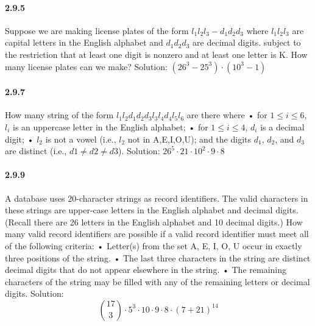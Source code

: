 \documentclass{article}
\begin{document}
\paragraph{2.9.5}
Suppose we are making license plates of the form $l_1 l_2 l_3 - d_1 d_2 d_3$ where $l_1 l_2 l_3$ are capital letters in the English alphabet and $d_1 d_2 d_3$ are decimal digits. subject to the restriction that at least one digit is nonzero and at least one letter is K. How many license plates can we make? \newline
Solution:\newline
$(26^3-25^3)\cdot (10^3-1)$
\paragraph{2.9.7}
How many string of the form $l_1 l_2 d_1 d_2 d_3 l_3 l_4 d_4 l_5 l_6$ are there where\newline
• for $1 \leq i \leq 6$, $l_i$
is an uppercase letter in the English alphabet;\newline
• for $1 \leq i \leq 4$, $d_i$
is a decimal digit;\newline
• $l_2$ is not a vowel (i.e., $l_2$ not in {A,E,I,O,U}); and the digits $d_1$, $d_2$, and $d_3$ are distinct (i.e., $d1 \neq d2 \neq d3$).\newline
Solution:\newline
$26^5\cdot 21 \cdot 10^2 \cdot 9 \cdot 8$
\paragraph{2.9.9}
A database uses 20-character strings as record identifiers. The valid characters in
these strings are upper-case letters in the English alphabet and decimal digits. (Recall
there are 26 letters in the English alphabet and 10 decimal digits.) How many valid
record identifiers are possible if a valid record identifier must meet all of the following
criteria:\newline
• Letter(s) from the set {A, E, I, O, U} occur in exactly three positions of the string.\newline
• The last three characters in the string are distinct decimal digits that do not appear elsewhere in the string.\newline
• The remaining characters of the string may be filled with any of the remaining
letters or decimal digits.\newline
Solution:\newline
$$\binom{17}{3}\cdot 5^3 \cdot 10 \cdot 9 \cdot 8 \cdot (7+21)^{14}$$
\end{document}
